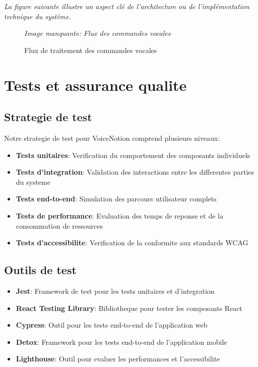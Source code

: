 \noindent
\textit{La figure suivante illustre un aspect clé de l'architecture ou de l'implémentation technique du système.}
\begin{figure}[H]
\centering
\textit{Image manquante: Flux des commandes vocales}
\caption{Flux de traitement des commandes vocales}
\label{fig:voice-commands-flow}
\end{figure}

\section{Tests et assurance qualite}
\subsection{Strategie de test}
Notre strategie de test pour VoiceNotion comprend plusieurs niveaux:
\begin{itemize}
    \item \textbf{Tests unitaires}: Verification du comportement des composants individuels
    \item \textbf{Tests d'integration}: Validation des interactions entre les differentes parties du systeme
    \item \textbf{Tests end-to-end}: Simulation des parcours utilisateur complets
    \item \textbf{Tests de performance}: Evaluation des temps de reponse et de la consommation de ressources
    \item \textbf{Tests d'accessibilite}: Verification de la conformite aux standards WCAG
\end{itemize}

\subsection{Outils de test}
\begin{itemize}
    \item \textbf{Jest}: Framework de test pour les tests unitaires et d'integration
    \item \textbf{React Testing Library}: Bibliotheque pour tester les composants React
    \item \textbf{Cypress}: Outil pour les tests end-to-end de l'application web
    \item \textbf{Detox}: Framework pour les tests end-to-end de l'application mobile
    \item \textbf{Lighthouse}: Outil pour evaluer les performances et l'accessibilite
\end{itemize}

